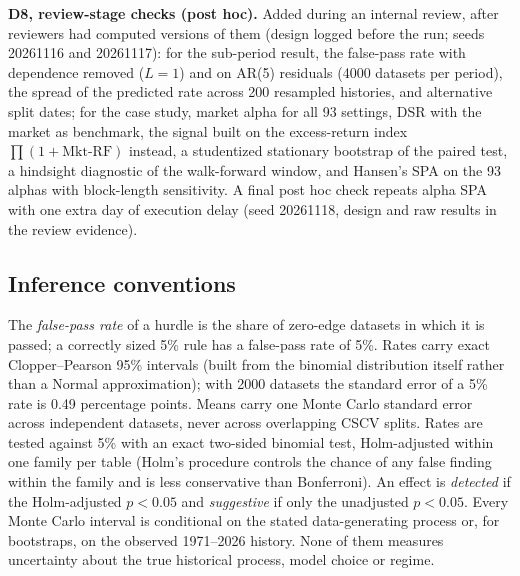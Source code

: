 \documentclass[11pt,a4paper]{article}
\begin{document}
\textbf{D8, review-stage checks (post hoc).} Added during an internal review, after reviewers had computed versions of them (design logged before the run; seeds 20261116 and 20261117): for the sub-period result, the false-pass rate with dependence removed ($L=1$) and on AR(5) residuals (4000 datasets per period), the spread of the predicted rate across 200 resampled histories, and alternative split dates; for the case study, market alpha for all 93 settings, DSR with the market as benchmark, the signal built on the excess-return index $\prod(1+\text{Mkt-RF})$ instead, a studentized stationary bootstrap of the paired test, a hindsight diagnostic of the walk-forward window, and Hansen's SPA on the 93 alphas with block-length sensitivity. A final post hoc check repeats alpha SPA with one extra day of execution delay (seed 20261118, design and raw results in the review evidence).

\subsection{Inference conventions}
The \emph{false-pass rate} of a hurdle is the share of zero-edge datasets in which it is passed; a correctly sized 5\% rule has a false-pass rate of 5\%. Rates carry exact Clopper--Pearson 95\% intervals (built from the binomial distribution itself rather than a Normal approximation); with 2000 datasets the standard error of a 5\% rate is 0.49 percentage points. Means carry one Monte Carlo standard error across independent datasets, never across overlapping CSCV splits. Rates are tested against 5\% with an exact two-sided binomial test, Holm-adjusted within one family per table (Holm's procedure controls the chance of any false finding within the family and is less conservative than Bonferroni). An effect is \emph{detected} if the Holm-adjusted $p<0.05$ and \emph{suggestive} if only the unadjusted $p<0.05$. Every Monte Carlo interval is conditional on the stated data-generating process or, for bootstraps, on the observed 1971--2026 history. None of them measures uncertainty about the true historical process, model choice or regime.
\end{document}
